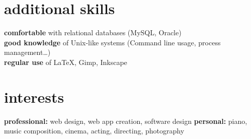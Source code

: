 \documentclass[]{lemaki-cv}
\begin{document}
	\section{additional skills}

	\textbf{comfortable} with relational databases (MySQL, Oracle) \\
	\textbf{good knowledge} of Unix-like systems (Command line usage, process
	management\ldots) \\
	\textbf{regular use} of LaTeX, Gimp, Inkscape


	\section{interests}

	\textbf{professional:} web design, web app creation, software design
	\textbf{personal:} piano, music composition, cinema, acting, directing, photography
\end{document}
